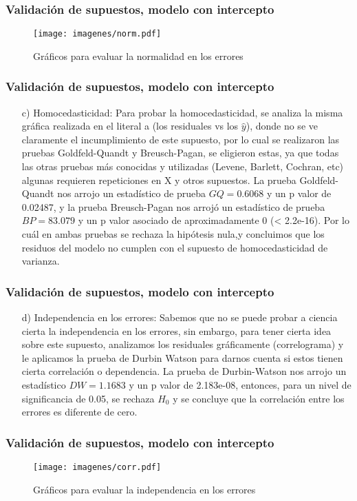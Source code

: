 \documentclass[12pt]{beamer}
\begin{document}
\begin{frame}
\frametitle{Validación de supuestos, modelo con intercepto}
\begin{figure}[h]
  \centering
  \texttt{[image: imagenes/norm.pdf]}
  \caption{Gráficos para evaluar la normalidad en los errores}\label{figura1}
\end{figure}
\end{frame}

\begin{frame}
\frametitle{Validación de supuestos, modelo con intercepto}
\begin{itemize}
\item[c)] Homocedasticidad: Para probar la homocedasticidad, se analiza la misma gráfica realizada en el literal a (los residuales vs los $\hat{y}$), donde no se ve claramente el incumplimiento de este supuesto, por lo cual se realizaron las pruebas Goldfeld-Quandt y Breusch-Pagan, se eligieron estas, ya que todas las otras pruebas más conocidas y utilizadas (Levene, Barlett, Cochran, etc) algunas requieren repeticiones en X y otros supuestos. La prueba Goldfeld-Quandt nos arrojo un estadístico de prueba $GQ = 0.6068$ y un p valor de 0.02487, y la prueba Breusch-Pagan nos arrojó un estadístico de prueba $BP = 83.079$ y un p valor asociado de aproximadamente 0 (< 2.2e-16). Por lo cuál en ambas pruebas se rechaza la hipótesis nula,y concluimos que los residuos del modelo no cumplen con el supuesto de homocedasticidad de varianza.
\end{itemize}
\end{frame}

\begin{frame}
\frametitle{Validación de supuestos, modelo con intercepto}
\begin{itemize}
\item[d)] Independencia en los errores: Sabemos que no se puede probar a ciencia cierta la independencia en los errores, sin embargo, para tener cierta idea sobre este supuesto, analizamos los residuales gráficamente (correlograma) y le aplicamos la prueba de Durbin Watson para darnos cuenta si estos tienen cierta correlación o dependencia. La prueba de Durbin-Watson nos arrojo un estadístico $DW = 1.1683$ y un p valor de 2.183e-08, entonces, para un nivel de significancia de 0.05, se rechaza $H_{0}$ y se concluye que la correlación entre los errores es diferente de cero.
\end{itemize}
\end{frame}

\begin{frame}
\frametitle{Validación de supuestos, modelo con intercepto}
\begin{figure}[h]
  \centering
  \texttt{[image: imagenes/corr.pdf]}
  \caption{Gráficos para evaluar la independencia en los errores}\label{figura1}
\end{figure}
\end{frame}
\end{document}
